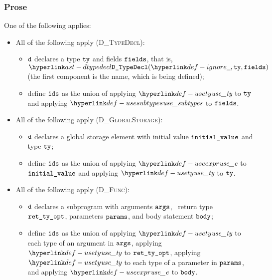 \subsubsection{Prose}
One of the following applies:
\begin{itemize}
  \item All of the following apply (\textsc{D\_TypeDecl}):
  \begin{itemize}
    \item $\texttt{d}$ declares a type $\texttt{ty}$ and fields $\texttt{fields}$, that is,
          $\DTypeDecl(\Ignore, \tty, \fields)$ (the first component is the name, which is being defined);
    \item define $\texttt{ids}$ as the union of applying $\usety$ to $\texttt{ty}$ and applying $\usesubtypes$ to $\texttt{fields}$.
  \end{itemize}

  \item All of the following apply (\textsc{D\_GlobalStorage}):
  \begin{itemize}
    \item $\texttt{d}$ declares a global storage element with initial value $\texttt{initial\_value}$ and type $\texttt{ty}$;
    \item define $\texttt{ids}$ as the union of applying $\useexpr$ to $\texttt{initial\_value}$ and applying $\usety$ to $\texttt{ty}$.
  \end{itemize}

  \item All of the following apply (\textsc{D\_Func}):
  \begin{itemize}
    \item $\texttt{d}$ declares a subprogram with arguments $\texttt{args}$, \optional\ return type \\
          $\texttt{ret\_ty\_opt}$, parameters $\texttt{params}$, and body statement $\texttt{body}$;
    \item define $\texttt{ids}$ as the union of applying $\usety$ to each type of an argument in $\texttt{args}$,
          applying $\usety$ to $\texttt{ret\_ty\_opt}$, applying $\usety$ to each type of a parameter in $\texttt{params}$,
          and applying $\useexpr$ to $\texttt{body}$.
  \end{itemize}
\end{itemize}

